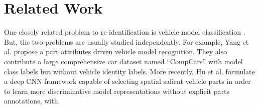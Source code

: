 \documentclass[10pt,twocolumn,letterpaper]{article}
\newcommand{\todo}[1]{}
\renewcommand{\todo}[1]{{\color{red} TODO: {#1}}}
\begin{document}

%

\section{Related Work}

One closely related problem to re-identification is vehicle model
classification
\cite{liao2015exploiting,yang2015compcars,sochor2016boxcars,hu2017deep}.
But, the two problems are usually studied independently.
For example, Yang et al. \cite{yang2015compcars} propose a part attributes driven
vehicle model recognition.
They also contribute a large comprehensive car dataset named ``CompCars''
with model class labels but without vehicle identity labels.
More recently, Hu et al. \cite{hu2017deep} formulate a deep CNN framework capable of
selecting spatial salient vehicle parts in order to learn more
discriminative model representations without explicit parts annotations, with
\end{document}
